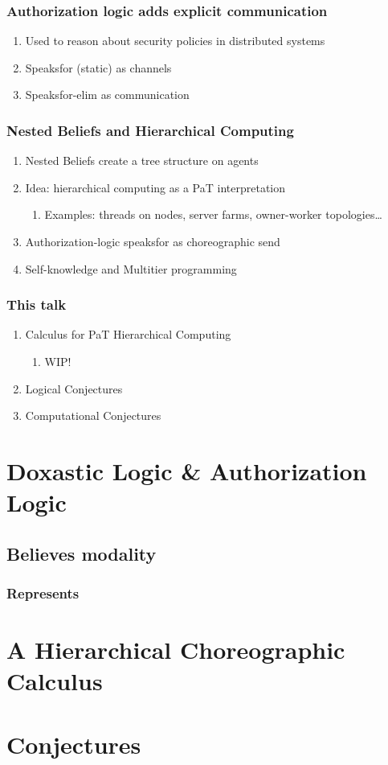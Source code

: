 \documentclass[11pt]{article}
\begin{document}
\subsubsection{Authorization logic adds explicit communication}
\label{sec:org85e6fe0}
\begin{enumerate}
\item Used to reason about security policies in distributed systems
\label{sec:org637cc2a}
\item Speaksfor (static) as channels
\label{sec:orgd0f5563}
\item Speaksfor-elim as communication
\label{sec:org97d5ef3}
\end{enumerate}
\subsubsection{Nested Beliefs and Hierarchical Computing}
\label{sec:org6cf666f}
\begin{enumerate}
\item Nested Beliefs create a tree structure on agents
\label{sec:orgc6353db}
\item Idea: hierarchical computing as a PaT interpretation
\label{sec:org3bca4e7}
\begin{enumerate}
\item Examples: threads on nodes, server farms, owner-worker topologies\ldots{}
\label{sec:org23ca5e6}
\end{enumerate}
\item Authorization-logic speaksfor as choreographic send
\label{sec:org384f63b}
\item Self-knowledge and Multitier programming
\label{sec:org1bb3711}
\end{enumerate}
\subsubsection{This talk}
\label{sec:orgb2497a3}
\begin{enumerate}
\item Calculus for PaT Hierarchical Computing
\label{sec:org6a8c9a9}
\begin{enumerate}
\item WIP!
\label{sec:org67bd4f7}
\end{enumerate}
\item Logical Conjectures
\label{sec:org822cbe2}
\item Computational Conjectures
\label{sec:org022538e}
\end{enumerate}
\section{Doxastic Logic \& Authorization Logic}
\label{sec:org11de604}
\subsection{Believes modality}
\label{sec:org3ae0db2}
\subsubsection{Represents}
\label{sec:orgd3ac5b0}
\section{A Hierarchical Choreographic Calculus}
\label{sec:org4c1020e}
\section{Conjectures}
\label{sec:org3d1b7c8}
\end{document}
